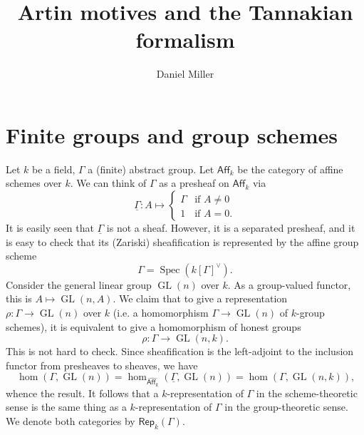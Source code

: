 \documentclass{article}
\title{Artin motives and the Tannakian formalism}
\author{Daniel Miller}
\DeclareMathOperator{\gl}{GL}
\DeclareMathOperator{\spec}{Spec}
\newcommand{\aff}[1]{\mathsf{Aff}_{#1}}
\newcommand{\rep}{\mathsf{Rep}}
\begin{document}
\maketitle





\section{Finite groups and group schemes}

Let $k$ be a field, $\Gamma$ a (finite) abstract group. Let $\aff k$ be the 
category of affine schemes over $k$. We can think of $\Gamma$ as a presheaf on 
$\aff k$ via 
\[
  \underline\Gamma : A \mapsto 
  \begin{cases} 
    \Gamma & \text{if $A\ne 0$} \\ 
    1 & \text{if $A=0$.} 
  \end{cases}
\]
It is easily seen that $\underline\Gamma$ is not a sheaf. However, it is a 
separated presheaf, and it is easy to check that its (Zariski) sheafification 
is represented by the affine group scheme 
\[
  \Gamma=\spec\left(k[\Gamma]^\vee\right) \text{.}
\]
Consider the general linear group $\gl(n)$ over $k$. As a group-valued functor, 
this is $A\mapsto \gl(n,A)$. We claim that to give a representation 
$\rho:\Gamma\to \gl(n)$ over $k$ (i.e. a homomorphism $\Gamma\to \gl(n)$ of 
$k$-group schemes), it is equivalent to give a homomorphism of honest groups 
\[
  \rho:\Gamma\to \gl(n,k) \text{.}
\]
This is not hard to check. Since sheafification is the left-adjoint to the 
inclusion functor from presheaves to sheaves, we have 
\[
  \hom(\Gamma,\gl(n)) = \hom_{\widehat{\aff k}}\left(\underline\Gamma,\gl(n)\right) = \hom(\Gamma,\gl(n,k))\text{,}
\]
whence the result. It follows that a $k$-representation of $\Gamma$ in the 
scheme-theoretic sense is the same thing as a $k$-representation of $\Gamma$ in 
the group-theoretic sense. We denote both categories by $\rep_k(\Gamma)$. 
\end{document}
